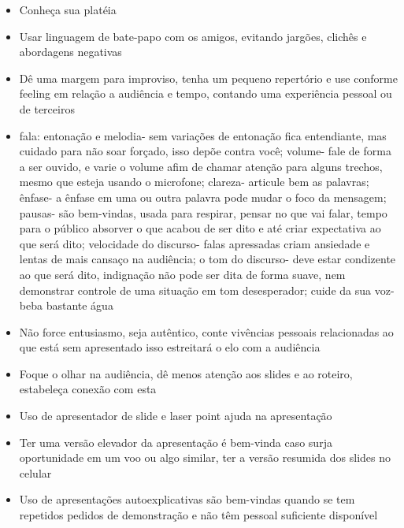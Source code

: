 \begin{itemize}
    \item Conheça sua platéia 
    \item Usar linguagem de bate-papo com os amigos, evitando jargões, clichês e abordagens negativas
    \item Dê uma margem para improviso, tenha um pequeno repertório e use conforme feeling em relação a audiência e tempo, contando uma experiência pessoal ou de terceiros
    \item fala: entonação e melodia- sem variações de entonação fica entendiante, mas cuidado para não soar forçado, isso depõe contra você; volume- fale de forma a ser ouvido, e varie o volume afim de chamar atenção para alguns trechos, mesmo que esteja usando o microfone; clareza- articule bem as palavras; ênfase- a ênfase em uma ou outra palavra pode mudar o foco da mensagem; pausas- são bem-vindas, usada para respirar, pensar no que vai falar, tempo para o público absorver o que acabou de ser dito e até criar expectativa ao que será dito; velocidade do discurso- falas apressadas criam ansiedade e lentas de mais cansaço na audiência; o tom do discurso- deve estar condizente ao que será dito, indignação não pode ser dita de forma suave, nem demonstrar controle de uma situação em tom desesperador; cuide da sua voz- beba bastante água  
    \item Não force entusiasmo, seja autêntico, conte vivências pessoais relacionadas ao que está sem apresentado isso estreitará o elo com a audiência
    \item Foque o olhar na audiência, dê menos atenção aos slides e ao roteiro, estabeleça conexão com esta
    \item Uso de apresentador de slide e laser point ajuda na apresentação
    \item Ter uma versão elevador da apresentação é bem-vinda caso surja oportunidade em um voo ou algo similar, ter a versão resumida dos slides no celular
    \item Uso de apresentações autoexplicativas são bem-vindas quando se tem repetidos pedidos de demonstração e não têm pessoal suficiente disponível

\end{itemize}



